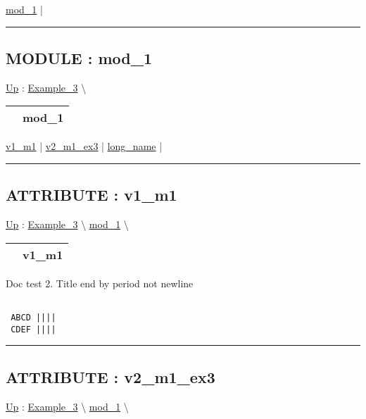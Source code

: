 \hyperlink{ecldoc:Example_3.mod_1}{mod\_1}  |

\rule{\linewidth}{0.5pt}

\subsection*{MODULE : mod\_1}
\hypertarget{ecldoc:Example_3.mod_1}{}
\hyperlink{ecldoc:Example_3}{Up} :
\hspace{0pt} \hyperlink{ecldoc:Example_3}{Example_3} \textbackslash 

{\renewcommand{\arraystretch}{1.5}
\begin{tabularx}{\textwidth}{|>{\raggedright\arraybackslash}l|X|}
\hline
\hspace{0pt} & mod\_1 \\
\hline
\end{tabularx}
}

\par


\hyperlink{ecldoc:example_3.mod_1.v1_m1}{v1\_m1}  |
\hyperlink{ecldoc:example_3.mod_1.v2_m1_ex3}{v2\_m1\_ex3}  |
\hyperlink{ecldoc:example_3.mod_1.long_name}{long\_name}  |

\rule{\linewidth}{0.5pt}

\subsection*{ATTRIBUTE : v1\_m1}
\hypertarget{ecldoc:example_3.mod_1.v1_m1}{}
\hyperlink{ecldoc:Example_3.mod_1}{Up} :
\hspace{0pt} \hyperlink{ecldoc:Example_3}{Example_3} \textbackslash 
\hspace{0pt} \hyperlink{ecldoc:Example_3.mod_1}{mod_1} \textbackslash 

{\renewcommand{\arraystretch}{1.5}
\begin{tabularx}{\textwidth}{|>{\raggedright\arraybackslash}l|X|}
\hline
\hspace{0pt} & v1\_m1 \\
\hline
\end{tabularx}
}

\par
Doc test 2. Title end by period not newline 
\begin{verbatim}

 ABCD ||||
 CDEF ||||\end{verbatim}




\rule{\linewidth}{0.5pt}
\subsection*{ATTRIBUTE : v2\_m1\_ex3}
\hypertarget{ecldoc:example_3.mod_1.v2_m1_ex3}{}
\hyperlink{ecldoc:Example_3.mod_1}{Up} :
\hspace{0pt} \hyperlink{ecldoc:Example_3}{Example_3} \textbackslash 
\hspace{0pt} \hyperlink{ecldoc:Example_3.mod_1}{mod_1} \textbackslash 

